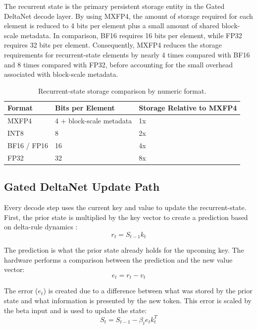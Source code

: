 \documentclass[conference]{IEEEtran}
\begin{document}
The recurrent state is the primary persistent storage entity in the Gated DeltaNet decode layer. By using MXFP4, the amount of storage required for each element is reduced to 4 bits per element plus a small amount of shared block-scale metadata. In comparison, BF16 requires 16 bits per element, while FP32 requires 32 bits per element. Consequently, MXFP4 reduces the storage requirements for recurrent-state elements by nearly 4 times compared with BF16 and 8 times compared with FP32, before accounting for the small overhead associated with block-scale metadata.

\begin{table}[t]
\centering
\caption{Recurrent-state storage comparison by numeric format.}
\label{tab:memory_footprint}
\begin{tabular}{lll}
\hline
Format & Bits per Element & Storage Relative to MXFP4 \\
\hline
MXFP4 & 4 + block-scale metadata & 1x \\
INT8 & 8 & 2x \\
BF16 / FP16 & 16 & 4x \\
FP32 & 32 & 8x \\
\hline
\end{tabular}
\end{table}

\subsection{Gated DeltaNet Update Path}
Every decode step uses the current key and value to update the recurrent-state. First, the prior state is multiplied by the key vector to create a prediction based on delta-rule dynamics \cite{b3}:
\begin{equation}
r_t = S_{t-1} k_t
\end{equation}

The prediction is what the prior state already holds for the upcoming key. The hardware performs a comparison between the prediction and the new value vector:
\begin{equation}
e_t = r_t - v_t
\end{equation}

The error ($e_t$) is created due to a difference between what was stored by the prior state and what information is presented by the new token. This error is scaled by the beta input and is used to update the state:
\begin{equation}
S_t = S_{t-1} - \beta_t e_t k_t^T
\end{equation}
\end{document}
